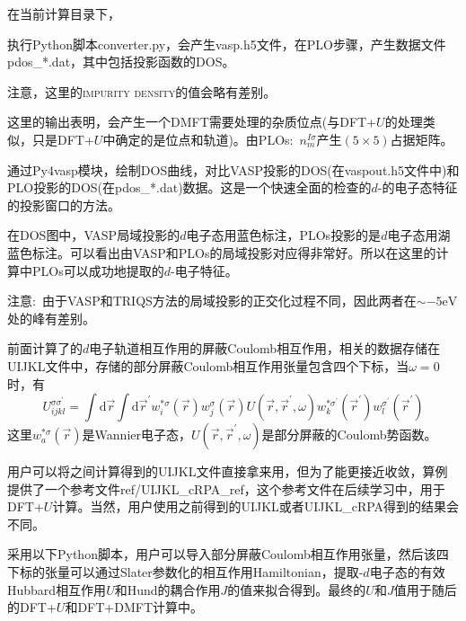 在当前计算目录下，%

执行\textrm{Python}脚本\textrm{converter.py}，会产生\textrm{vasp.h5}文件，在\textrm{PLO}步骤，产生数据文件\textrm{pdos\_*.dat}，其中包括投影函数的\textrm{DOS}。

注意，这里的\textsc{impurity density}的值会略有差别。

这里的输出表明，会产生一个\textrm{DMFT}需要处理的杂质位点(与\textrm{DFT+}$U$的处理类似，只是\textrm{DFT+}$U$中确定的是位点和轨道)。由\textrm{PLOs}:~$n_m^{I\sigma}$产生$(5\times5)$占据矩阵。

通过\textrm{Py4vasp}模块，绘制\textrm{DOS}曲线，对比\textrm{VASP}投影的\textrm{DOS}(在\textrm{vaspout.h5}文件中)和\textrm{PLO}投影的\textrm{DOS}(在\textrm{pdos\_*.dat})数据。这是一个快速全面的检查的$d$-的电子态特征的投影窗口的方法。

在\textrm{DOS}图中，\textrm{VASP}局域投影的$d$电子态用蓝色标注，\textrm{PLOs}投影的是$d$电子态用湖蓝色标注。可以看出由\textrm{VASP}和\textrm{PLOs}的局域投影对应得非常好。所以在这里的计算中\textrm{PLOs}可以成功地提取的$d$-电子特征。

注意:~由于\textrm{VASP}和\textrm{TRIQS}方法的局域投影的正交化过程不同，因此两者在$\sim-5\mathrm{eV}$处的峰有差别。

前面计算了的$d$电子轨道相互作用的屏蔽\textrm{Coulomb}相互作用，相关的数据存储在\textrm{UIJKL}文件中，存储的部分屏蔽\textrm{Coulomb}相互作用张量包含四个下标，当$\omega=0$时，有
\begin{displaymath}
	U_{ijkl}^{\sigma\sigma^{\prime}}=\int\mathrm{d}\vec r\int\mathrm{d}\vec r^{\prime}w_i^{\ast\sigma}(\vec r)w_j^{\sigma}(\vec r)U(\vec r,\vec r^{\prime},\omega)w_k^{\ast\sigma^{\prime}}(\vec r^{\prime})w_l^{\sigma^{\prime}}(\vec r^{\prime})
\end{displaymath}
这里$w_a^{\ast\sigma}(\vec r)$是\textrm{Wannier}电子态，$U(\vec r,\vec r^{\prime},\omega)$是部分屏蔽的\textrm{Coulomb}势函数。

用户可以将之间计算得到的\textrm{UIJKL}文件直接拿来用，但为了能更接近收敛，算例提供了一个参考文件\textrm{ref/UIJKL\_cRPA\_ref}，这个参考文件在后续学习中，用于\textrm{DFT+}$U$计算。当然，用户使用之前得到的\textrm{UIJKL}或者\textrm{UIJKL\_cRPA}得到的结果会不同。

采用以下\textrm{Python}脚本，用户可以导入部分屏蔽\textrm{Coulomb}相互作用张量，然后该四下标的张量可以通过\textrm{Slater}参数化的相互作用\textrm{Hamiltonian}，提取-$d$电子态的有效\textrm{Hubbard}相互作用$U$和\textrm{Hund}的耦合作用$J$的值来拟合得到。最终的$U$和$J$值用于随后的\textrm{DFT+}$U$和\textrm{DFT+DMFT}计算中。

